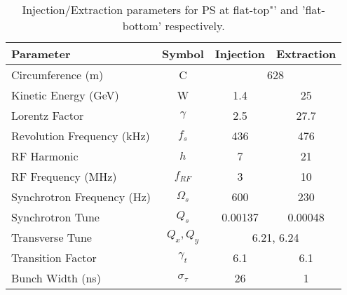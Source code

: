 \begin{table}
    \centering
    \begin{tabular}{lccc}
        Parameter                  & Symbol        & Injection                      & Extraction \\
        \hline
        Circumference (m)          & C             & \multicolumn{2}{c}{628}                     \\
        Kinetic Energy (GeV)       & W             & 1.4                            & 25         \\
        Lorentz Factor             & $\gamma$      & 2.5                            & 27.7       \\
        Revolution Frequency (kHz) & $f_s$         & 436                            & 476        \\
        RF Harmonic                & $h$           & 7                              & 21         \\
        RF Frequency (MHz)         & $f_{RF}$      & 3                              & 10         \\
        Synchrotron Frequency (Hz) & $\Omega_s$    & 600                            & 230        \\
        Synchrotron Tune           & $Q_s$         & 0.00137                        & 0.00048    \\
        Transverse Tune            & $Q_x, Q_y$    & \multicolumn{2}{c}{6.21, 6.24}              \\
        Transition Factor          & $\gamma_t$    & 6.1                            & 6.1        \\
        Bunch Width (ns)           & $\sigma_\tau$ & 26                             & 1
    \end{tabular}
    \caption{Injection/Extraction parameters for PS at flat-top"' and 'flat-bottom' respectively.}
    \label{tab:ps_parameters}
\end{table}